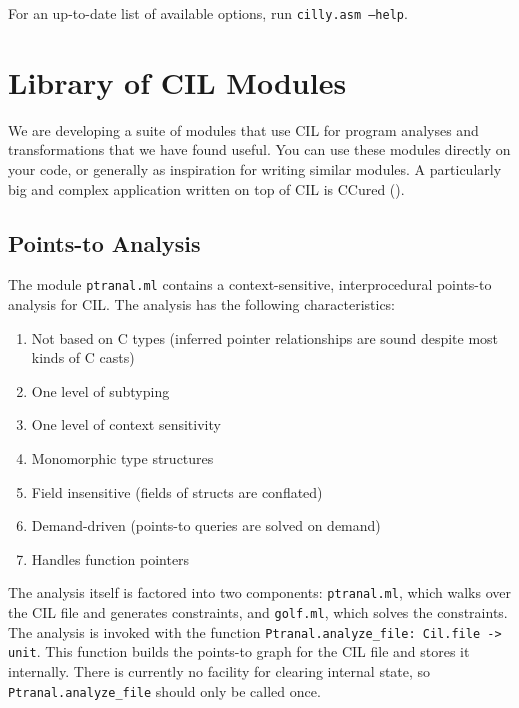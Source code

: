 \documentclass{article}
\def\t#1{{\tt #1}}
\begin{document}
\begin{itemize}
For an up-to-date list of available options, run \t{cilly.asm --help}. 

\end{itemize}

\section{Library of CIL Modules} \label{sec-Extension}

 We are developing a suite of modules that use CIL for program analyses and
transformations that we have found useful. You can use these modules directly
on your code, or generally as inspiration for writing similar modules. A
particularly big and complex application written on top of CIL is CCured
().

\subsection{Points-to Analysis}

The module \t{ptranal.ml} contains a context-sensitive, interprocedural
points-to analysis for CIL. The analysis has the following
characteristics:

\begin{enumerate}
\item Not based on C types (inferred pointer relationships are sound
despite most kinds of C casts)
\item One level of subtyping 
\item One level of context sensitivity
\item Monomorphic type structures
\item Field insensitive (fields of structs are conflated)
\item Demand-driven (points-to queries are solved on demand)
\item Handles function pointers 
\end{enumerate}

The analysis itself is factored into two components: \t{ptranal.ml},
which walks over the CIL file and generates constraints, and
\t{golf.ml}, which solves the constraints. The analysis is invoked
with the function \t{Ptranal.analyze\_file: Cil.file -> unit}. This
function builds the points-to graph for the CIL file and stores it
internally. There is currently no facility for clearing internal
state, so \t{Ptranal.analyze\_file} should only be called once.
\end{document}
